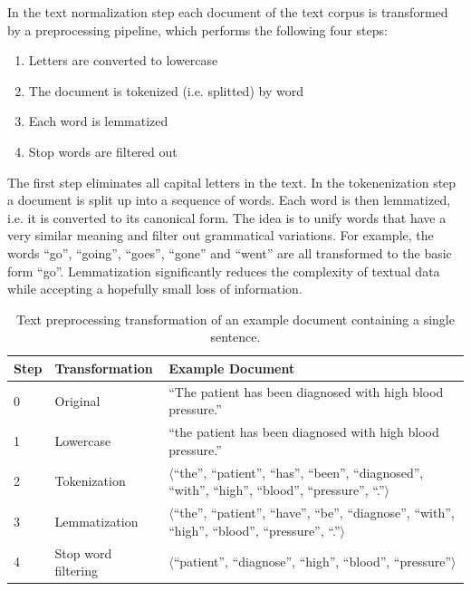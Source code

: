 In the text normalization step each document of the text corpus is transformed by a preprocessing pipeline, which performs the following four steps:
\begin{enumerate} 
	\item Letters are converted to lowercase
	\item The document is tokenized (i.e. splitted) by word
	\item Each word is lemmatized
	\item Stop words are filtered out
\end{enumerate}
The first step eliminates all capital letters in the text.
In the tokenenization step a document is split up into a sequence of words.
Each word is then lemmatized, i.e. it is converted to its canonical form.
The idea is to unify words that have a very similar meaning and filter out grammatical variations.
For example, the words   \enquote{go}, \enquote{going}, \enquote{goes}, \enquote{gone} and   \enquote{went} are all transformed to the basic form   \enquote{go}.
Lemmatization significantly reduces the complexity of textual data while accepting a hopefully small loss of information.

\begin{table}[!htbp]
	\begin{tabularx}{\textwidth}{l l p{9.8cm}}
		\toprule
		\textbf{Step} & \textbf{Transformation} & \textbf{Example Document}                                                       \\ \midrule
		0             & Original       &   \enquote{The patient has been diagnosed with high blood pressure.} \\
		1             & Lowercase               &   \enquote{the patient has been diagnosed with high blood pressure.} \\
		2 & Tokenization  & $\langle$\enquote{the}, \enquote{patient}, \enquote{has}, \enquote{been}, \enquote{diagnosed}, \enquote{with}, \enquote{high}, \enquote{blood}, \enquote{pressure}, \enquote{.}$\rangle$ \\
		3 & Lemmatization & $\langle$\enquote{the}, \enquote{patient}, \enquote{have},  \enquote{be}, \enquote{diagnose}, \enquote{with},  \enquote{high}, \enquote{blood}, \enquote{pressure}, \enquote{.}$\rangle$  \\
		4             & Stop word filtering     & $\langle$\enquote{patient}, \enquote{diagnose}, \enquote{high}, \enquote{blood}, \enquote{pressure}$\rangle$ \\ \bottomrule
	\end{tabularx}
	\caption[Text preprocessing transformation of an example document]{Text preprocessing transformation of an example document containing a single sentence.}
	\label{tab:text-preprocessing}
\end{table}

